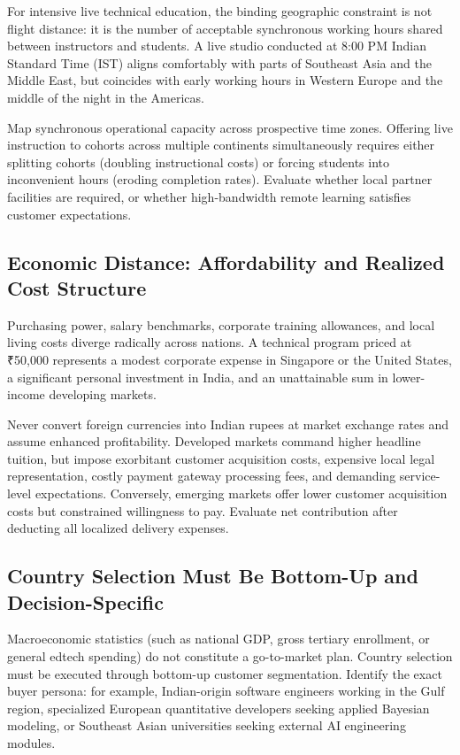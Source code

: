 For intensive live technical education, the binding geographic constraint is not flight distance: it is the number of acceptable synchronous working hours shared between instructors and students. A live studio conducted at 8:00 PM Indian Standard Time (IST) aligns comfortably with parts of Southeast Asia and the Middle East, but coincides with early working hours in Western Europe and the middle of the night in the Americas.

Map synchronous operational capacity across prospective time zones. Offering live instruction to cohorts across multiple continents simultaneously requires either splitting cohorts (doubling instructional costs) or forcing students into inconvenient hours (eroding completion rates). Evaluate whether local partner facilities are required, or whether high-bandwidth remote learning satisfies customer expectations.

\subsection{Economic Distance: Affordability and Realized Cost Structure}
\label{sec:economic_distance_affordability}

Purchasing power, salary benchmarks, corporate training allowances, and local living costs diverge radically across nations. A technical program priced at ₹50,000 represents a modest corporate expense in Singapore or the United States, a significant personal investment in India, and an unattainable sum in lower-income developing markets.

Never convert foreign currencies into Indian rupees at market exchange rates and assume enhanced profitability. Developed markets command higher headline tuition, but impose exorbitant customer acquisition costs, expensive local legal representation, costly payment gateway processing fees, and demanding service-level expectations. Conversely, emerging markets offer lower customer acquisition costs but constrained willingness to pay. Evaluate net contribution after deducting all localized delivery expenses.

\subsection{Country Selection Must Be Bottom-Up and Decision-Specific}
\label{sec:bottom_up_country_selection}

Macroeconomic statistics (such as national GDP, gross tertiary enrollment, or general edtech spending) do not constitute a go-to-market plan. Country selection must be executed through bottom-up customer segmentation. Identify the exact buyer persona: for example, Indian-origin software engineers working in the Gulf region, specialized European quantitative developers seeking applied Bayesian modeling, or Southeast Asian universities seeking external AI engineering modules.

